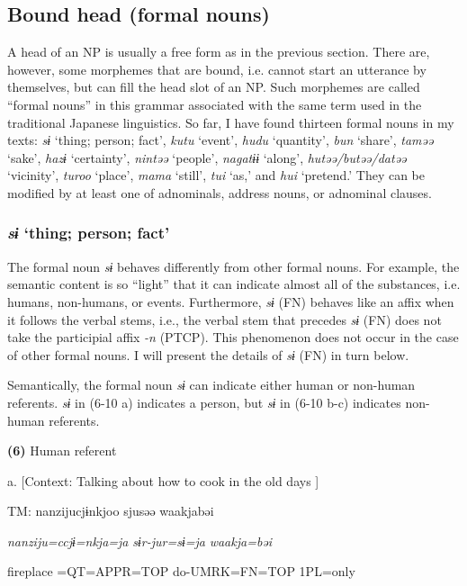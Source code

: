 \subsection{Bound head (formal nouns)}

A head of an NP is usually a free form as in the previous section. There are, however, some morphemes that are bound, i.e. cannot start an utterance by themselves, but can fill the head slot of an NP. Such morphemes are called “formal nouns” in this grammar associated with the same term used in the traditional Japanese linguistics. So far, I have found thirteen formal nouns in my texts: \textit{sɨ} ‘thing; person; fact’, \textit{kutu} ‘event’, \textit{hudu} ‘quantity’, \textit{bun} ‘share’, \textit{taməə} ‘sake’, \textit{hazɨ} ‘certainty’, \textit{nintəə} ‘people’, \textit{nagatɨɨ} ‘along’, \textit{hutəə/butəə/datəə} ‘vicinity’, \textit{turoo} ‘place’, \textit{mama} ‘still’, \textit{tui} ‘as,’ and \textit{hui} ‘pretend.’ They can be modified by at least one of adnominals, address nouns, or adnominal clauses.

\subsubsection{\textit{sɨ} ‘thing; person; fact’}

The formal noun \textit{sɨ} behaves differently from other formal nouns. For example, the semantic content is so “light” that it can indicate almost all of the substances, i.e. humans, non-humans, or events. Furthermore, \textit{sɨ} (FN) behaves like an affix when it follows the verbal stems, i.e., the verbal stem that precedes \textit{sɨ} (FN) does not take the participial affix \textit{{}-n} (PTCP). This phenomenon does not occur in the case of other formal nouns. I will present the details of \textit{sɨ} (FN) in turn below.

Semantically, the formal noun \textit{sɨ} can indicate either human or non-human referents. \textit{sɨ} in (6-10 a) indicates a person, but \textit{sɨ} in (6-10 b-c) indicates non-human referents.

\textbf{(6)}  Human referent

  a.  [Context: Talking about how to cook in the old days ]

    TM:  nanzijucjɨnkjoo  sjusəə  waakjabəi

      \textit{nanziju=ccjɨ=nkja=ja}  \textit{sɨr-jur=sɨ=ja}  \textit{waakja=bəi}

      fireplace =QT=APPR=TOP  do-UMRK=FN=TOP  1PL=only

